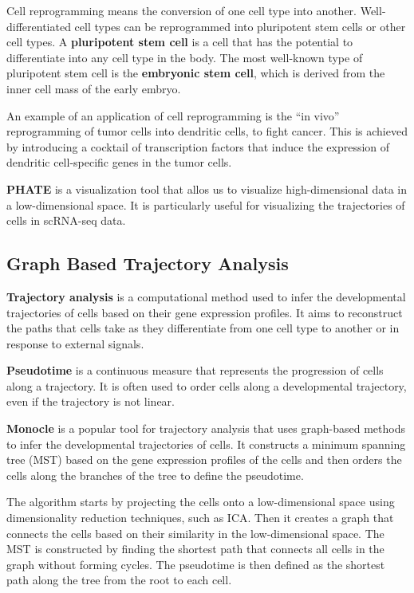 \documentclass[a4paper]{article}
\begin{document}
Cell reprogramming means the conversion of one cell type into another. Well-differentiated
cell types can be reprogrammed into pluripotent stem cells or other cell types. 
A \textbf{pluripotent stem cell} is a cell that has the potential to differentiate into
any cell type in the body. The most well-known type of pluripotent stem cell is the
\textbf{embryonic stem cell}, which is derived from the inner cell mass of the early
embryo.

An example of an application of cell reprogramming is the ``in vivo''
reprogramming of tumor cells into dendritic cells, to fight cancer. This is
achieved by introducing a cocktail of transcription factors that induce the
expression of dendritic cell-specific genes in the tumor cells.

\textbf{PHATE} is a visualization tool that allos us to visualize high-dimensional
data in a low-dimensional space. It is particularly useful for visualizing
the trajectories of cells in scRNA-seq data. 

\subsection*{Graph Based Trajectory Analysis}

\textbf{Trajectory analysis} is a computational method used to infer the
developmental trajectories of cells based on their gene expression profiles.
It aims to reconstruct the paths that cells take as they differentiate
from one cell type to another or in response to external signals.

\textbf{Pseudotime} is a continuous measure that represents the progression
of cells along a trajectory. It is often used to order cells along a
developmental trajectory, even if the trajectory is not linear.

\textbf{Monocle} is a popular tool for trajectory analysis that uses
graph-based methods to infer the developmental trajectories of cells.
It constructs a minimum spanning tree (MST) based on the gene expression
profiles of the cells and then orders the cells along the branches of
the tree to define the pseudotime.

The algorithm starts by projecting the cells onto a low-dimensional space
using dimensionality reduction techniques, such as ICA. Then it creates
a graph that connects the cells based on their similarity in the low-dimensional
space. The MST is constructed by finding the shortest path that connects
all cells in the graph without forming cycles. The pseudotime is then
defined as the shortest path along the tree from the root to each cell.
\end{document}
